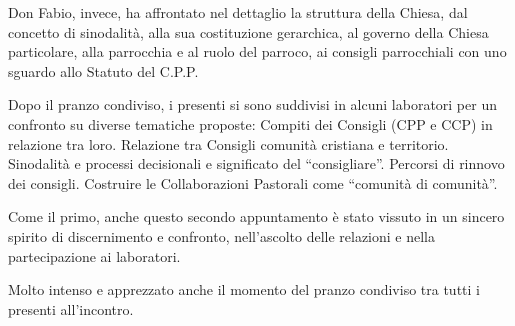 Don Fabio, invece, ha affrontato nel dettaglio la struttura della Chiesa, dal concetto di sinodalità, alla sua costituzione gerarchica, al governo della Chiesa particolare, alla parrocchia e al ruolo del parroco, ai consigli parrocchiali con uno sguardo allo Statuto del C.P.P.

Dopo il pranzo condiviso, i presenti si sono suddivisi in alcuni laboratori per un confronto su diverse tematiche proposte: Compiti dei Consigli (CPP e CCP) in relazione tra loro. Relazione tra Consigli comunità cristiana e territorio. Sinodalità e processi decisionali e significato del “consigliare”. Percorsi di rinnovo dei consigli. Costruire le Collaborazioni Pastorali come “comunità di comunità”.

Come il primo, anche questo secondo appuntamento è stato vissuto in un sincero spirito di discernimento e confronto, nell’ascolto delle relazioni e nella partecipazione ai laboratori.

Molto intenso e apprezzato anche il momento del pranzo condiviso tra tutti i presenti all’incontro.


